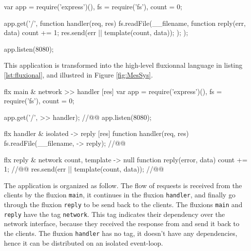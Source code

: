 \begin{code}[js,
  caption={Simple web application that replies to every request with its own source code and a counter},
  label={lst:source}]
var app = require('express')(),
    fs = require('fs'),
    count = 0;

app.get('/', function handler(req, res){
  fs.readFile(__filename, function reply(err, data) {
    count += 1;
    res.send(err || template(count, data));
  });
});

app.listen(8080);
\end{code}

This application is transformed into the high-level fluxionnal language in listing \ref{lst:fluxional}, and illustred in Figure \ref{fig:MesSys}.


\begin{code}[flx, caption={Transformation of the example application in our high-level fluxional language},label={lst:fluxional}]
flx main & network
>> handler [res]
  var app = require('express')(),
      fs = require('fs'),
      count = 0;

  app.get('/', >> handler); //@\label{lst:fluxional-streamtohandler}@
  app.listen(8080);

flx handler & isolated
-> reply [res]
  function handler(req, res) {
    fs.readFile(__filename, -> reply); //@\label{lst:fluxional-readfile}@
  }

flx reply & network {count, template}
-> null
  function reply(error, data) {
    count += 1; //@\label{lst:fluxional-counter}@
    res.send(err || template(count, data)); //@\label{lst:fluxional-ressend}@
  }
\end{code}

The application is organized as follow.
The flow of requests is received from the clients by the fluxion \texttt{main}, it continues in the fluxion \texttt{handler}, and finally go through the fluxion \texttt{reply} to be send back to the clients.
The fluxions \texttt{main} and \texttt{reply} have the tag \texttt{network}.
This tag indicates their dependency over the network interface, because they  received the response from and send it back to the clients.
The fluxion \texttt{handler} has no tag, it doesn't have any dependencies, hence it can be distributed on an isolated event-loop.


